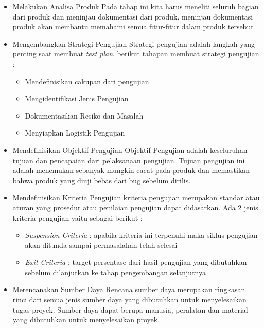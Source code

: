 \begin{itemize}
	\item {Melakukan Analisa Produk}
	\newline Pada tahap ini kita harus meneliti seluruh bagian dari produk dan  meninjau dokumentasi dari produk. meninjau dokumentasi produk akan membantu memahami semua fitur-fitur dalam produk tersebut
	
	\item {Mengembangkan Strategi Pengujian}
	\newline Strategi pengujian adalah langkah yang penting saat membuat \textit{test plan}. berikut tahapan membuat strategi pengujian :
	\newpage
	\begin{itemize}
		\itemsep0em
		\item Mendefinisikan cakupan dari pengujian
		\item Mengidentifikasi Jenis Pengujian
		\item Dokumentasikan Resiko dan Masalah
		\item Menyiapkan Logistik Pengujian
	\end{itemize}
	
	\item {Mendefinisikan Objektif Pengujian}
	\newline Objektif Pengujian adalah keseluruhan tujuan dan pencapaian dari pelaksanaan pengujian. Tujuan pengujian ini adalah menemukan sebanyak mungkin cacat pada produk dan memastikan bahwa produk yang diuji bebas dari bug sebelum dirilis.
	
	\item Mendefinisikan Kriteria Pengujian
	\newline kriteria pengujian merupakan standar atau aturan yang prosedur atau penilaian pengujian dapat didasarkan. Ada 2 jenis kriteria pengujian yaitu sebagai berikut :
	\begin{itemize}
		\itemsep0em
		\item \textit{Suspension Criteria} : apabila kriteria ini terpenuhi maka siklus pengujian akan ditunda sampai permasalahan telah selesai
		\item \textit{Exit Criteria} : target persentase dari hasil pengujian yang dibutuhkan sebelum dilanjutkan ke tahap pengembangan selanjutnya
	\end{itemize}

	\item {Merencanakan Sumber Daya}
	\newline Rencana sumber daya merupakan ringkasan rinci dari semua jenis sumber daya yang dibutuhkan untuk menyelesaikan tugas proyek. Sumber daya dapat berupa manusia, peralatan dan material yang dibutuhkan untuk menyelesaikan proyek.
	

\end{itemize}
